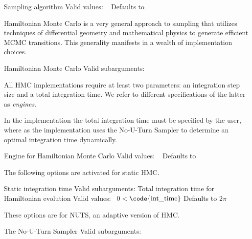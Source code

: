 \begin{description}
      {Sampling algorithm}
      {Valid values: \  }
      {Defaults to }
\end{description}
%
Hamiltonian Monte Carlo is a very general approach to sampling that
utilizes techniques of differential geometry and mathematical physics
to generate efficient MCMC transitions.  This generality manifests in
a wealth of implementation choices.
%
\begin{description}
        {Hamiltonian Monte Carlo}
        {Valid subarguments: }
\end{description}
%
All HMC implementations require at least two parameters: an
integration step size and a total integration time.  We refer to
different specifications of the latter as \textit{engines}.

In the  implementation the total integration time
must be specified by the user, where as the 
implementation uses the No-U-Turn Sampler to determine
an optimal integration time dynamically. 
%
\begin{description}
          {Engine for Hamiltonian Monte Carlo}
          {Valid values: \  }
          {Defaults to }
\end{description}
%
The following options are activated for static HMC.
%
\begin{description}
            {Static integration time}
            {Valid subarguments: }
%
              {Total integration time for Hamiltonian evolution}
              {Valid values: \  $0 < \mbox{\code{int\_time}}$}
              {Defaults to $2\pi$}
\end{description}
%
These options are for NUTS, an adaptive version of HMC.
%
\begin{description}
            {The No-U-Turn Sampler}
            {Valid subarguments: }
%
\end{description}

